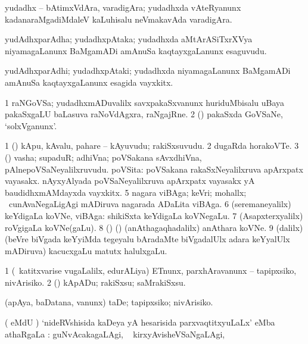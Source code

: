 {\bentry
{} 
\gl{\nA}
\expl{}
\bmng
yudadhx -- bAtimxVdAra, varadigAra; yudadhxda vAteRyanunx kadanaraMgadiMdaleV kaLuhisalu neVmakavAda varadigAra. 
\emng
\eentry

\bentry
{} 
\gl{\nA}
\expl{}
\bmng
yudAdhxparAdha; yudadhxpAtaka; yudadhxda aMtArASiTxrXVya niyamagaLanunx BaMgamADi amAnuSa kaqtayxgaLanunx esaguvudu. 
\emng
\eentry

\bentry
{} 
\gl{\nA}
\expl{}
\bmng
yudAdhxparAdhi; yudadhxpAtaki; yudadhxda niyamagaLanunx BaMgamADi amAnuSa kaqtayxgaLanunx esagida vayxkitx. 
\emng
\eentry

\bentry
{} 
\gl{\nA}
\expl{}
\bmng
\bnum
\num{1} raNGoVSa; yudadhxmADuvalilx savxpakaSxvanunx huriduMbisalu uBaya pakaSxgaLU baLasuva raNoVdAgxra, raNgajRne. 
\num{2} (\rUpa) pakaSxda GoVSaNe, `solxVganunx'. 
\enum
\emng
\eentry

\bentry
{} 
\gl{\nA}
\expl{}
\bmng
\bnum
\num{1} (\pArxparx) kApu, kAvalu, pahare -- kAyuvudu; rakiSxsuvudu. 
\num{2} dugaRda horakoVTe. 
\num{3} (\pArxparx) vasha; supaduR; adhiVna; poVSakana sAvxdhiVna, pAlnepoVSaNeyalilxruvudu. 
 poVSita: 
\banum
{} poVSakana rakaSxNeyalilxruva apArxpatx vayasakx. 
 nAyxyAlyada poVSaNeyalilxruva apArxpatx vayasakx yA baudidhxmAMdayxda vayxkitx. 
\eanum
\numie
\num{5} nagara viBAga; keVri; mohallx; \kanmu\ cunAvaNegaLigAgi mADiruva nagarada ADaLita viBAga. 
\num{6} (seremaneyalilx) keYdigaLa koVNe, viBAga:  shikiSxta keYdigaLa koVNegaLu. 
\num{7} (Asapxterxyalilx) roVgigaLa koVNe(gaLu). 
\num{8} (\ca) (\birx) (anAthagaqhadalilx) anAthara koVNe. 
\num{9} (\bava dalilx) (beVre biVgada keYyiMda tegeyalu bAradaMte biVgadalUlx adara keYyalUlx mADiruva) kacucxgaLu matutx halulxgaLu. 
\enum
\emng
\eentry

\bentry
{} 
\gl{\sakirx}
\expl{}
\bmng
\bnum
\num{1} (\kanmu\ katitxvarise \mo vugaLalilx, edurALiya) ETnunx, parxhAravanunx -- tapipxsiko, nivArisiko. 
\num{2} (\pArxparx) kApADu; rakiSxsu; saMrakiSxsu. 
\enum
\emng

\noindent 
\gl{\pagu}
\expl{}
\bmng
{} 
\banum
{}  
 (apAya, baDatana, \mo vanunx) taDe; tapipxsiko; nivArisiko. 
\eanum
\emng
\eentry

\bentry
{} 
\gl{\uparx}
\expl{}
\bmng
( eMdU \parx) `nideRVshisida kaDeya yA hesarisida parxvaqtitxyuLaLx' eMba athaRgaLa \uparx : 
\banum
{} guNvAcakagaLAgi, \udA\  
 kirxyAvisheVSaNgaLAgi, \udA\  
\eanum
\emng
\eentry

}

